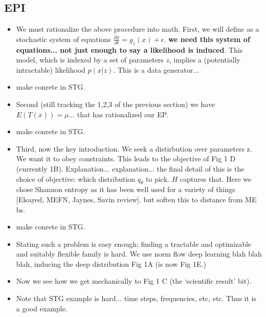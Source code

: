 \documentclass[11pt]{article}
\begin{document}
\subsection{EPI}

\begin{itemize}
\item We must rationalize the above procedure into math.  First, we will define as a stochastic system of equations $\frac{\partial x}{\partial t} = g_z(x) + \epsilon$.  {\bf we need this system of equations... not just enough to say a likelihood is induced}.   This model, which is indexed by a set of parameters $z$, implies a (potentially intractable) likelihood $p(x|z)$.   This is a data generator...  
\item make conrete in STG.
\item Second (still tracking the 1,2,3 of the previous section) we have $E(T(x)) = \mu$... that has rationalized our EP.
\item make conrete in STG.
\item Third, now the key introduction.  We seek a distirbution over parameters z.  We want it to obey constraints.   This leads to the objective of Fig 1 D (currently 1B).   Explanation... explanation... the final detail of this is the choice of objective: which distribution $q_\theta$ to pick.  $H$ captures that.  Here we chose Shannon entropy as it has been well used for a variety of things [Elsayed, MEFN, Jaynes, Savin review]. but soften this to distance from ME bs.
\item make conrete in STG.
\item Stating such a problem is easy enough; finding a tractable and optimizable and suitably flexible family is hard.  We use norm flow deep learning blah blah blah, inducing the deep distribution Fig 1A  (is now Fig 1E.)
\item Now we see how we get mechanically to Fig 1 C (the `scientific result' bit).
\item Note that STG example is hard... time steps, frequencies, etc, etc.  Thus it is a good example.
\end{itemize}
\end{document}
